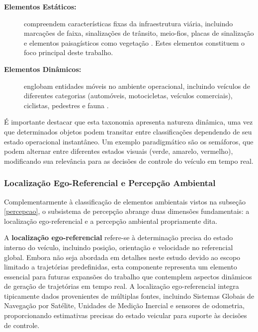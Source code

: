 \begin{description}
\item[\textbf{Elementos Estáticos:}] compreendem características fixas da infraestrutura viária, incluindo marcações de faixa, sinalizações de trânsito, meio-fios, placas de sinalização e elementos paisagísticos como vegetação \cite[p. ~3]{zheng2023simultaneous}. Estes elementos constituem o foco principal deste trabalho.

\item[\textbf{Elementos Dinâmicos:}] englobam entidades móveis no ambiente operacional, incluindo veículos de diferentes categorias (automóveis, motocicletas, veículos comerciais), ciclistas, pedestres e fauna \cite[p. ~17]{zheng2023simultaneous}.
\end{description}

É importante destacar que esta taxonomia apresenta natureza dinâmica, uma vez que determinados objetos podem transitar entre classificações dependendo de seu estado operacional instantâneo. Um exemplo paradigmático são os semáforos, que podem alternar entre diferentes estados visuais (verde, amarelo, vermelho), modificando sua relevância para as decisões de controle do veículo em tempo real.

\subsubsection{Localização Ego-Referencial e Percepção Ambiental} \label{subsubsec:ego-referencial_per-ambiental}

Complementarmente à classificação de elementos ambientais vistos na subseção \ref{percepcao}, o subsistema de percepção abrange duas dimensões fundamentais: a localização ego-referencial e a percepção ambiental propriamente dita.

A \textbf{localização ego-referencial} refere-se à determinação precisa do estado interno do veículo, incluindo posição, orientação e velocidade no referencial global. Embora não seja abordada em detalhes neste estudo devido ao escopo limitado a trajetórias predefinidas, esta componente representa um elemento essencial para futuras expansões do trabalho que contemplem aspectos dinâmicos de geração de trajetórias em tempo real. A localização ego-referencial integra tipicamente dados provenientes de múltiplas fontes, incluindo Sistemas Globais de Navegação por Satélite, Unidades de Medição Inercial e sensores de odometria, proporcionando estimativas precisas do estado veicular para suporte às decisões de controle.

